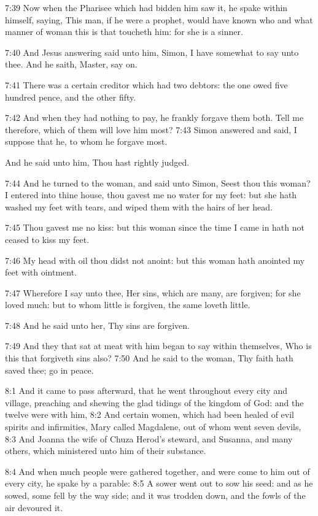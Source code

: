 7:39 Now when the Pharisee which had bidden him saw it, he spake within himself, saying, This man, if he were a prophet, would have known who and what manner of woman this is that toucheth him: for she is a sinner.

7:40 And Jesus answering said unto him, Simon, I have somewhat to say unto thee. And he saith, Master, say on.

7:41 There was a certain creditor which had two debtors: the one owed five hundred pence, and the other fifty.

7:42 And when they had nothing to pay, he frankly forgave them both.  Tell me therefore, which of them will love him most?  7:43 Simon answered and said, I suppose that he, to whom he forgave most.

And he said unto him, Thou hast rightly judged.

7:44 And he turned to the woman, and said unto Simon, Seest thou this woman? I entered into thine house, thou gavest me no water for my feet: but she hath washed my feet with tears, and wiped them with the hairs of her head.

7:45 Thou gavest me no kiss: but this woman since the time I came in hath not ceased to kiss my feet.

7:46 My head with oil thou didst not anoint: but this woman hath anointed my feet with ointment.

7:47 Wherefore I say unto thee, Her sins, which are many, are forgiven; for she loved much: but to whom little is forgiven, the same loveth little.

7:48 And he said unto her, Thy sins are forgiven.

7:49 And they that sat at meat with him began to say within themselves, Who is this that forgiveth sins also?  7:50 And he said to the woman, Thy faith hath saved thee; go in peace.

8:1 And it came to pass afterward, that he went throughout every city and village, preaching and shewing the glad tidings of the kingdom of God: and the twelve were with him, 8:2 And certain women, which had been healed of evil spirits and infirmities, Mary called Magdalene, out of whom went seven devils, 8:3 And Joanna the wife of Chuza Herod's steward, and Susanna, and many others, which ministered unto him of their substance.

8:4 And when much people were gathered together, and were come to him out of every city, he spake by a parable: 8:5 A sower went out to sow his seed: and as he sowed, some fell by the way side; and it was trodden down, and the fowls of the air devoured it.

